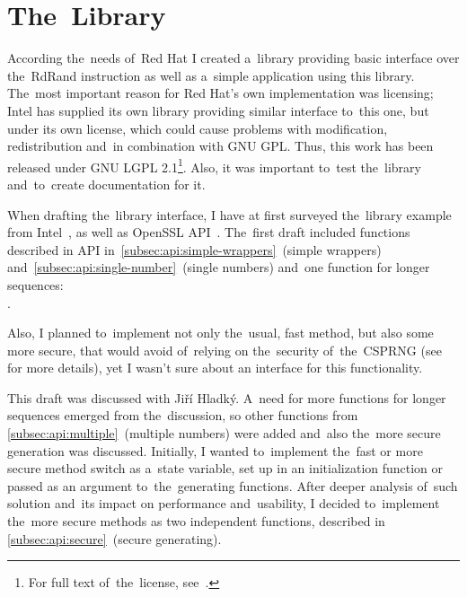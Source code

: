 \chapter{The~Library}\label{chap:library}
\par{
According the~needs of~Red Hat I created a~library providing basic interface over the~RdRand instruction as well as a~simple application using this library. The~most important reason for Red Hat's own implementation was licensing; Intel has supplied its own library providing similar interface to~this one, but under its own license, which could cause problems with modification, redistribution and~in combination with GNU GPL. Thus, this work has been released under GNU LGPL 2.1\footnote{For full text of~the~license, see~\cite{GNULGPL}.}. Also, it was important to~test the~library and~to~create documentation for it.
}

\par{
When drafting the~library interface, I have at first surveyed the~library example from Intel~\cite{IntelDRNGGuide}, as well as OpenSSL API~\cite{OpenSSLAPI}. The~first draft included functions described in API in~\ref{subsec:api:simple-wrappers}~(simple wrappers) and~\ref{subsec:api:single-number}~(single numbers) and~one function for longer sequences: \\. 
}

\par{
Also, I planned to~implement not only the~usual, fast method, but also some more secure, that would avoid of~relying on the~security of~the~CSPRNG (see  for more details), yet I wasn't sure about an interface for this functionality.
}

\par{
This draft was discussed with Jiří Hladký. A~need for more functions for longer sequences emerged from the~discussion, so other functions from \ref{subsec:api:multiple}~(multiple numbers) were added and~also the~more secure generation was discussed. Initially, I wanted to~implement the~fast or more secure method switch as a~state variable, set up in an initialization function or passed as an argument to~the~generating functions. After deeper analysis of~such solution and~its impact on performance and~usability, I decided to~implement the~more secure methods as two independent functions, described in \ref{subsec:api:secure}~(secure generating).  
}

